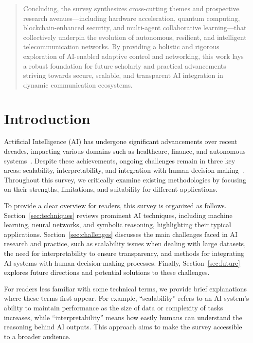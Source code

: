 \documentclass[sigconf]{acmart}
\begin{document}
\begin{abstract}
Concluding, the survey synthesizes cross-cutting themes and prospective research avenues—including hardware acceleration, quantum computing, blockchain-enhanced security, and multi-agent collaborative learning—that collectively underpin the evolution of autonomous, resilient, and intelligent telecommunication networks. By providing a holistic and rigorous exploration of AI-enabled adaptive control and networking, this work lays a robust foundation for future scholarly and practical advancements striving towards secure, scalable, and transparent AI integration in dynamic communication ecosystems.
\end{abstract}

\maketitle

\section{Introduction}

Artificial Intelligence (AI) has undergone significant advancements over recent decades, impacting various domains such as healthcare, finance, and autonomous systems~\cite{smith2020advances}. Despite these achievements, ongoing challenges remain in three key areas: scalability, interpretability, and integration with human decision-making~\cite{johnson2019challenges}. Throughout this survey, we critically examine existing methodologies by focusing on their strengths, limitations, and suitability for different applications.

To provide a clear overview for readers, this survey is organized as follows. Section~\ref{sec:techniques} reviews prominent AI techniques, including machine learning, neural networks, and symbolic reasoning, highlighting their typical applications. Section~\ref{sec:challenges} discusses the main challenges faced in AI research and practice, such as scalability issues when dealing with large datasets, the need for interpretability to ensure transparency, and methods for integrating AI systems with human decision-making processes. Finally, Section~\ref{sec:future} explores future directions and potential solutions to these challenges.

For readers less familiar with some technical terms, we provide brief explanations where these terms first appear. For example, “scalability” refers to an AI system's ability to maintain performance as the size of data or complexity of tasks increases, while “interpretability” means how easily humans can understand the reasoning behind AI outputs. This approach aims to make the survey accessible to a broader audience.
\end{document}
